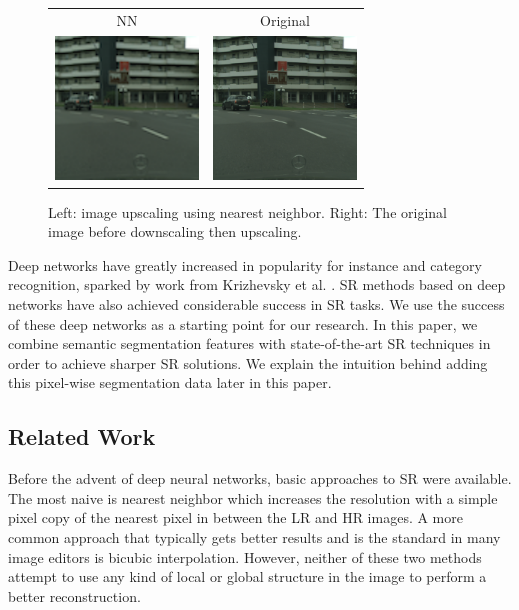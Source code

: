 \documentclass[10pt,twocolumn,letterpaper]{article}
\begin{document}
\begin{figure}[ht]
    \begin{tabular}{cc}
            NN & Original \\
    \includegraphics[trim=0 0 0 0, clip,
        width=1.5in]{images/example_lr_image.png} &
    \includegraphics[trim=0 0 0 0, clip,
        width=1.5in]{images/example_hr_image.png} \\

    \end{tabular}
    \caption{Left: image upscaling using nearest neighbor. Right: The
    original image before downscaling then upscaling.}
    \label{fig:exampleIntroFirst}
\end{figure}

Deep networks have greatly increased in popularity for instance and category
recognition, sparked by work from Krizhevsky et al. \cite{AlexNet}. SR methods
based on deep networks have also achieved considerable success in SR tasks. We
use the success of these deep networks as a starting point for our research. In
this paper, we combine semantic segmentation features with state-of-the-art SR
techniques in order to achieve sharper SR solutions. We explain the intuition
behind adding this pixel-wise segmentation data later in this paper.


\subsection{Related Work}
Before the advent of deep neural networks, basic approaches to SR were
available. The most naive is nearest neighbor which increases the resolution
with a simple pixel copy of the nearest pixel in between the LR and HR images.
A more common approach that typically gets better results and is the standard
in many image editors is bicubic interpolation.  However, neither of these two
methods attempt to use any kind of local or global structure in the image to
perform a better reconstruction.
\end{document}
